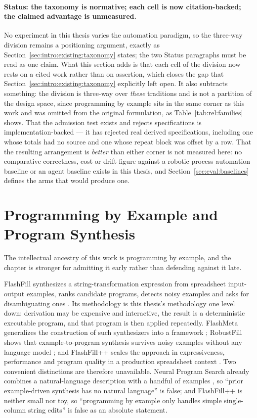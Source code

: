 \paragraph{Status: the taxonomy is normative; each cell is now citation-backed; the claimed
advantage is unmeasured.}
No experiment in this thesis varies the automation paradigm, so the three-way division remains
a positioning argument, exactly as Section~\ref{sec:intro:existing:taxonomy} states; the two
Status paragraphs must be read as one claim. What this section adds is that each cell of the
division now rests on a cited work rather than on assertion, which closes the gap that
Section~\ref{sec:intro:existing:taxonomy} explicitly left open. It also subtracts something:
the division is three-way over \emph{these} traditions and is not a partition of the design
space, since programming by example sits in the same corner as this work and was omitted from
the original formulation, as Table~\ref{tab:rel:families} shows. That the admission test exists
and rejects specifications is implementation-backed --- it has rejected real derived
specifications, including one whose totals had no source and one whose repeat block was offset
by a row. That the resulting arrangement is \emph{better} than either corner is not measured
here: no comparative correctness, cost or drift figure against a robotic-process-automation
baseline or an agent baseline exists in this thesis, and Section~\ref{sec:eval:baselines}
defines the arms that would produce one.

\section{Programming by Example and Program Synthesis}
\label{sec:rel:pbe}

The intellectual ancestry of this work is programming by example, and the chapter is stronger
for admitting it early rather than defending against it late.

FlashFill synthesizes a string-transformation expression from spreadsheet input-output
examples, ranks candidate programs, detects noisy examples and asks for disambiguating ones
\cite{gulwani2011flashfill}. Its methodology is this thesis's methodology one level down:
derivation may be expensive and interactive, the result is a deterministic executable program,
and that program is then applied repeatedly. FlashMeta generalizes the construction of such
synthesizers into a framework \cite{polozov2015flashmeta}; RobustFill shows that
example-to-program synthesis survives noisy examples without any language model
\cite{devlin2017robustfill}; and FlashFill++ scales the approach in expressiveness,
performance and program quality in a production spreadsheet context
\cite{cambronero2023flashfillpp}. Two convenient distinctions are therefore unavailable. Neural
Program Search already combines a natural-language description with a handful of examples
\cite{polosukhin2018neuralprogramsearch}, so ``prior example-driven synthesis has no natural
language'' is false; and FlashFill++ is neither small nor toy, so ``programming by example only
handles simple single-column string edits'' is false as an absolute statement.

